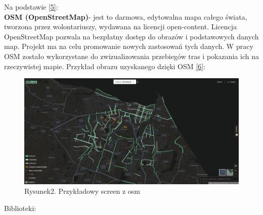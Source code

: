 \documentclass[a4paper, twoside, 12pt, justified]{article}
\begin{document}
	 Na podstawie \hyperlink{osm}{[5]}:\\
	 \textbf{OSM (OpenStreetMap)}- jest to darmowa, edytowalna mapa całego świata, tworzona przez wolontariuszy, wydawana na licencji open-content. Licencja OpenStreetMap pozwala na bezpłatny dostęp do obrazów i podstawowych danych map. Projekt ma na celu promowanie nowych zastosowań tych danych. W pracy OSM zostało wykorzystane do zwizualizowania przebiegów tras i pokazania ich na rzeczywistej mapie. Przykład obrazu uzyskanego dzięki OSM \hyperlink{osm_example}{[6]}: \\
	 
 	\begin{figure}[h]
 	\includegraphics[scale=0.23]{osm_example}
 	\centering
 	\\
 	{Rysunek2. Przykładowy screen z osm}
	\end{figure}
	 
	 Biblioteki: \\
	 
	 
	 
	 
	
	
	
\end{document}

